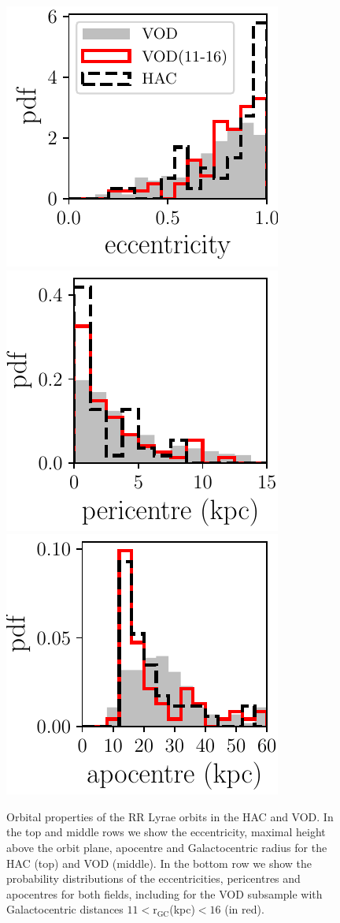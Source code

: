 \documentclass[fleqn,usenatbib]{mnras}
\begin{document}
\begin{figure}
              \includegraphics[scale=0.473]{eccentricities.pdf} 
    \includegraphics[scale=0.473]{pericentres.pdf} 
                          \includegraphics[scale=0.473]{apocentres.pdf} 
\vspace{-0.45cm}
  \caption{Orbital properties of the RR Lyrae orbits in the HAC and VOD. In the top and middle rows we show the eccentricity, maximal height above the orbit plane, apocentre and Galactocentric radius for the HAC (top) and VOD (middle). In the bottom row we show the probability distributions of the eccentricities, pericentres and apocentres for both fields, including for the VOD subsample with Galactocentric distances $11<\mathrm{r_{GC}}$(kpc)$<16$ (in red).}
    \label{fig:orbits}   
    \end{figure}
\end{document}
